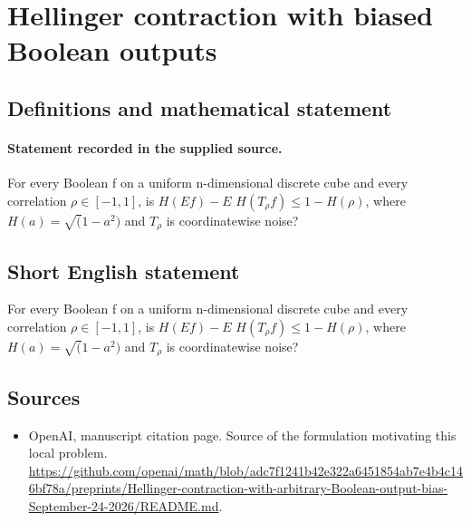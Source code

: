 \documentclass[11pt]{article}
\begin{document}
\section*{Hellinger contraction with biased Boolean outputs}\label{statement}
\subsection{Definitions and mathematical statement}
\paragraph{Statement recorded in the supplied source.}
For every Boolean f on a uniform n-dimensional discrete cube and every correlation $\rho \in [-1,1]$, is $H(Ef)-E$ $H(T_\rho f)\leq 1-H(\rho )$, where $H(a)=\surd (1-a^{2})$ and $T_\rho $ is coordinatewise noise?
\subsection{Short English statement}
For every Boolean f on a uniform n-dimensional discrete cube and every correlation $\rho \in [-1,1]$, is $H(Ef)-E$ $H(T_\rho f)\leq 1-H(\rho )$, where $H(a)=\surd (1-a^{2})$ and $T_\rho $ is coordinatewise noise?
\subsection{Sources}
\begin{itemize}
\item[S1] OpenAI, manuscript citation page. Source of the formulation motivating this local problem.
\url{https://github.com/openai/math/blob/adc7f1241b42e322a6451854ab7e4b4c146bf78a/preprints/Hellinger-contraction-with-arbitrary-Boolean-output-bias-September-24-2026/README.md}.
\end{itemize}
\end{document}
